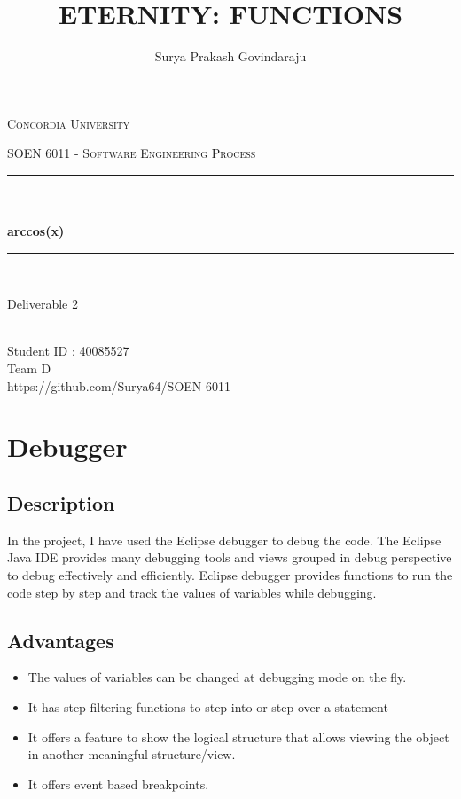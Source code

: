 \documentclass[12pt]{report}
\title{ETERNITY: FUNCTIONS}
\author{Surya Prakash Govindaraju}
\date{}
\makeatletter
\let\thetitle\@title
\let\theauthor\@author
\makeatother
\begin{document}
\begin{titlepage}
	\centering
    \vspace*{0.5 cm}
\begin{center}    \textsc{\Large Concordia University}\\[2.0 cm]	\end{center}
	\textsc{\Large  SOEN 6011 - Software Engineering Process }\\[0.5 cm]
	\rule{\linewidth}{0.2 mm} \\[0.4 cm]
	{ \huge \textbf \thetitle}\\[0.2 cm]
	{ \huge \textbf{arccos(x)}}
	\rule{\linewidth}{0.2 mm} \\[1.5 cm]

\begin{center}   {\Large Deliverable 2}\\[2.0 cm]
\end{center}	
\begin{center}   {\Large \textbf{\theauthor}} \\[0.2 cm]
                 {\large Student ID : 40085527 }\\[0.2 cm]
                 {\large Team D }\\[2.0 cm]	
                 {\large https://github.com/Surya64/SOEN-6011}
\end{center}
	
\end{titlepage}

\tableofcontents
\pagebreak

\renewcommand{\thesection}{\arabic{section}}
\section{Debugger}
\subsection{Description}
In the project, I have used the Eclipse debugger to debug the code. The Eclipse Java IDE provides many debugging tools and views grouped in debug perspective to debug effectively and efficiently. Eclipse debugger provides functions to run the code step by step and track the values of variables while debugging.

\subsection{Advantages}
\begin{itemize}
    \item The values of variables can be changed at debugging mode on the fly.
    \item It has step filtering functions to step into or step over a statement
    \item It offers a feature to show the logical structure that allows viewing the object in another meaningful structure/view.
    \item It offers event based breakpoints.
\end{itemize}
\end{document}
